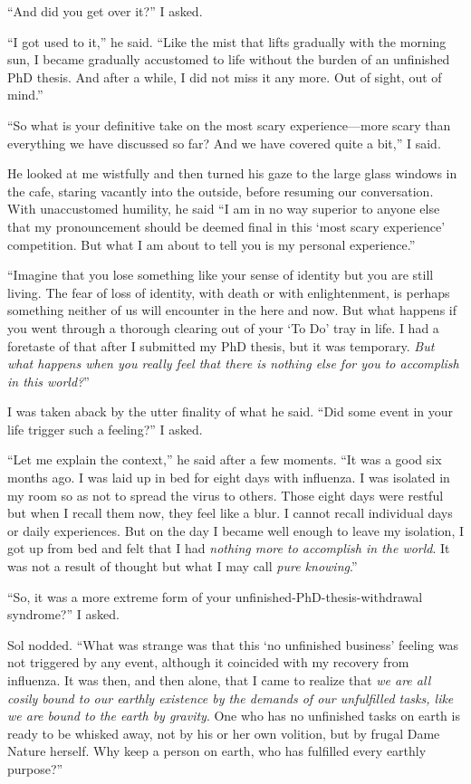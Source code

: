 \documentclass[
  a4paper,
]{article}
\begin{document}
``And did you get over it?'' I asked.

``I got used to it,'' he said. ``Like the mist that lifts gradually with
the morning sun, I became gradually accustomed to life without the
burden of an unfinished PhD thesis. And after a while, I did not miss it
any more. Out of sight, out of mind.''

``So what is your definitive take on the most scary experience---more
scary than everything we have discussed so far? And we have covered
quite a bit,'' I said.

He looked at me wistfully and then turned his gaze to the large glass
windows in the cafe, staring vacantly into the outside, before resuming
our conversation. With unaccustomed humility, he said ``I am in no way
superior to anyone else that my pronouncement should be deemed final in
this `most scary experience' competition. But what I am about to tell
you is my personal experience.''

``Imagine that you lose something like your sense of identity but you
are still living. The fear of loss of identity, with death or with
enlightenment, is perhaps something neither of us will encounter in the
here and now. But what happens if you went through a thorough clearing
out of your `To Do' tray in life. I had a foretaste of that after I
submitted my PhD thesis, but it was temporary. \emph{But what happens
when you really feel that there is nothing else for you to accomplish in
this world?}''

I was taken aback by the utter finality of what he said. ``Did some
event in your life trigger such a feeling?'' I asked.

``Let me explain the context,'' he said after a few moments. ``It was a
good six months ago. I was laid up in bed for eight days with influenza.
I was isolated in my room so as not to spread the virus to others. Those
eight days were restful but when I recall them now, they feel like a
blur. I cannot recall individual days or daily experiences. But on the
day I became well enough to leave my isolation, I got up from bed and
felt that I had \emph{nothing more to accomplish in the world}. It was
not a result of thought but what I may call \emph{pure knowing}.''

``So, it was a more extreme form of your
unfinished-PhD-thesis-withdrawal syndrome?'' I asked.

Sol nodded. ``What was strange was that this `no unfinished business'
feeling was not triggered by any event, although it coincided with my
recovery from influenza. It was then, and then alone, that I came to
realize that \emph{we are all cosily bound to our earthly existence by
the demands of our unfulfilled tasks, like we are bound to the earth by
gravity}. One who has no unfinished tasks on earth is ready to be
whisked away, not by his or her own volition, but by frugal Dame Nature
herself. Why keep a person on earth, who has fulfilled every earthly
purpose?''
\end{document}

